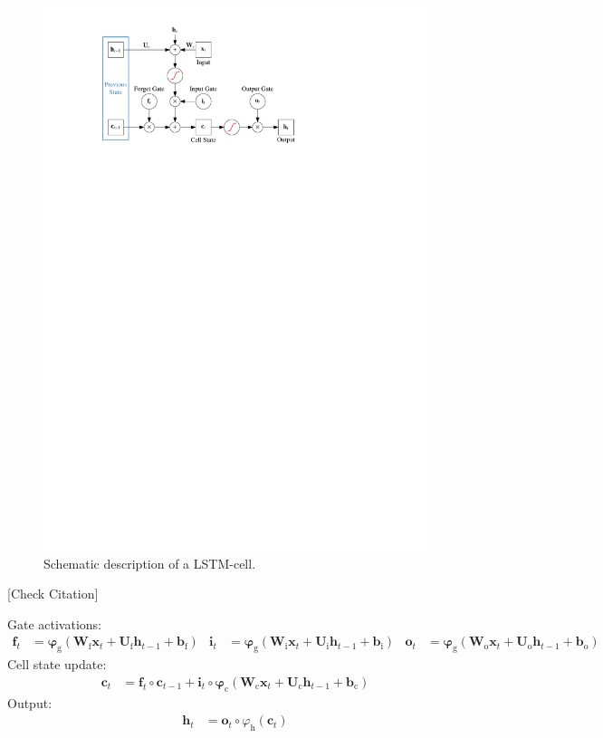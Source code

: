\begin{figure}[t]
  \centering
  \includegraphics{./figures/theory/LSTM.pdf}
  \caption{Schematic description of a LSTM-cell.}
  \label{fig:schematic_lstm}
\end{figure}

[Check Citation]\cite{lstm}

Gate activations:
\begin{align*}
  \mathbf{f}_{t} &= \bm{\varphi}_{\text{g}}\left( \mathbf{W}_{\text{f}} \mathbf{x}_{t} + \mathbf{U}_{\text{f}} \mathbf{h}_{t-1} + \mathbf{b}_{\text{f}} \right) &
  \mathbf{i}_{t} &= \bm{\varphi}_{\text{g}}\left( \mathbf{W}_{\text{i}} \mathbf{x}_{t} + \mathbf{U}_{\text{i}} \mathbf{h}_{t-1} + \mathbf{b}_{\text{i}} \right) &
  \mathbf{o}_{t} &= \bm{\varphi}_{\text{g}}\left( \mathbf{W}_{\text{o}} \mathbf{x}_{t} + \mathbf{U}_{\text{o}} \mathbf{h}_{t-1} + \mathbf{b}_{\text{o}} \right)
\end{align*}
Cell state update:
\begin{align*}
  \mathbf{c}_{t} &= \mathbf{f}_{t} \circ \mathbf{c}_{t-1}
                   + \mathbf{i}_{t} \circ \bm{\varphi}_{\text{c}}(
                   \mathbf{W}_{\text{c}} \mathbf{x}_{t}+ \mathbf{U}_{\text{c}}
                   \mathbf{h}_{t-1} + \mathbf{b}_{\text{c}})
\end{align*}
Output:
\begin{align*}
  \mathbf{h}_{t} &= \mathbf{o}_{t} \circ \varphi_{\text{h}}(\mathbf{c}_{t})
\end{align*}

